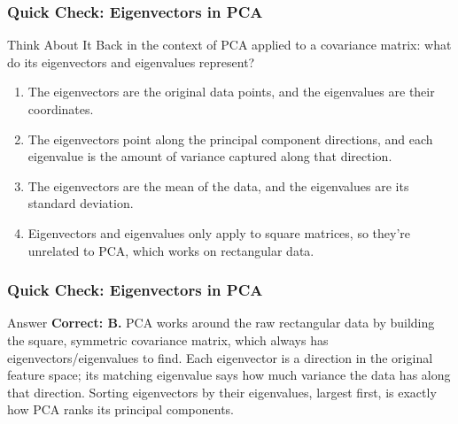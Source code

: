 


\begin{frame}[fragile]\frametitle{Quick Check: Eigenvectors in PCA}
\begin{block}{Think About It}
Back in the context of PCA applied to a covariance matrix: what do its eigenvectors and
eigenvalues represent?
\begin{enumerate}
  \item[A.] The eigenvectors are the original data points, and the eigenvalues are their
  coordinates.
  \item[B.] The eigenvectors point along the principal component directions, and each
  eigenvalue is the amount of variance captured along that direction.
  \item[C.] The eigenvectors are the mean of the data, and the eigenvalues are its standard
  deviation.
  \item[D.] Eigenvectors and eigenvalues only apply to square matrices, so they're unrelated
  to PCA, which works on rectangular data.
\end{enumerate}
\end{block}
\end{frame}

\begin{frame}[fragile]\frametitle{Quick Check: Eigenvectors in PCA}
\begin{block}{Answer}
\textbf{Correct: B.} PCA works around the raw rectangular data by
building the square, symmetric covariance matrix, which always has eigenvectors/eigenvalues
to find. Each eigenvector is a direction in the original feature space; its matching
eigenvalue says how much variance the data has along that direction. Sorting eigenvectors by
their eigenvalues, largest first, is exactly how PCA ranks its principal components.
\end{block}
\end{frame}

